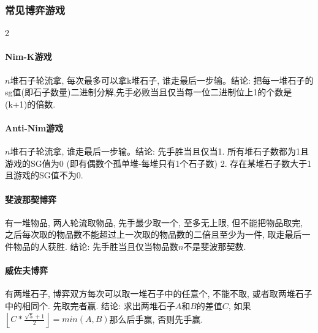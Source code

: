 \subsubsection{常见博弈游戏}
\begin{multicols}{2}
\paragraph{Nim-K游戏}$n$堆石子轮流拿, 每次最多可以拿k堆石子, 谁走最后一步输。结论: 把每一堆石子的sg值(即石子数量)二进制分解,先手必败当且仅当每一位二进制位上1的个数是(k+1)的倍数.
\paragraph{Anti-Nim游戏}$n$堆石子轮流拿, 谁走最后一步输。结论: 先手胜当且仅当1. 所有堆石子数都为1且游戏的SG值为0 (即有偶数个孤单堆-每堆只有1个石子数) 2. 存在某堆石子数大于1且游戏的SG值不为0.
\paragraph{斐波那契博弈}有一堆物品, 两人轮流取物品, 先手最少取一个, 至多无上限, 但不能把物品取完, 之后每次取的物品数不能超过上一次取的物品数的二倍且至少为一件, 取走最后一件物品的人获胜. 结论: 先手胜当且仅当物品数$n$不是斐波那契数.
\paragraph{威佐夫博弈}有两堆石子, 博弈双方每次可以取一堆石子中的任意个, 不能不取, 或者取两堆石子中的相同个. 先取完者赢. 结论: 求出两堆石子$A$和$B$的差值$C$, 如果$\left\lfloor C*\frac{\sqrt{5}+1}{2}\right\rfloor=min(A,B)$那么后手赢, 否则先手赢.

\end{multicols}
